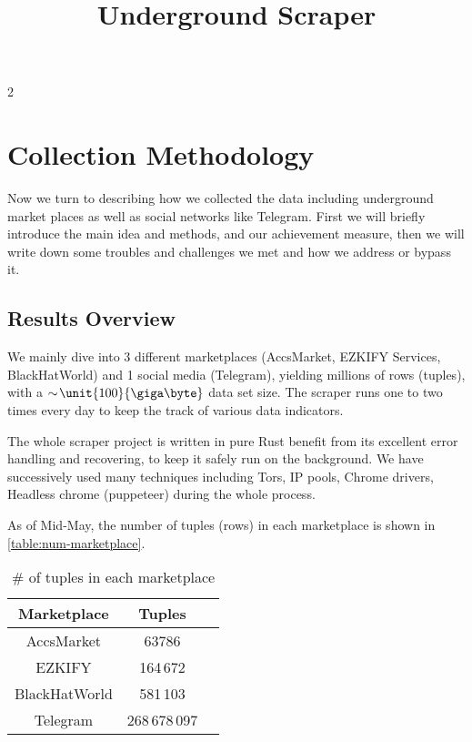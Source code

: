\documentclass{article}
\title{Underground Scraper}
\begin{document}
	\maketitle
	\addtocounter{section}2
	\section{Collection Methodology}

	Now we turn to describing how we collected the data including underground market places as well as social networks like Telegram.
	First we will briefly introduce the main idea and methods, and our achievement measure, then we will write down some troubles and challenges we met and how we address or bypass it.

	\subsection{Results Overview}

	We mainly dive into 3 different marketplaces (AccsMarket, EZKIFY Services, BlackHatWorld) and 1 social media (Telegram), yielding millions of rows (tuples), with a $\sim\!\unit {100} {\giga\byte}$ data set size. The scraper runs one to two times every day to keep the track of various data indicators.

	The whole scraper project is written in pure Rust benefit from its excellent error handling and recovering, to keep it safely run on the background. We have successively used many techniques including Tors\cite{tor}, IP pools, Chrome drivers, Headless chrome (puppeteer) during the whole process.

	As of Mid-May, the number of tuples (rows) in each marketplace is shown in \autoref{table:num-marketplace}.

	\begin{table}[htb]
		\centering
		\begin{tabular}{|c|c|c|}
			\hline
				Marketplace & Tuples \\
			\hline\hline
				AccsMarket & 63786 \\
			\hline
				EZKIFY & 164\,672 \\
			\hline
				BlackHatWorld & 581\,103 \\
			\hline
				Telegram & 268\,678\,097 \\
			\hline
		\end{tabular}
		\caption{\# of tuples in each marketplace}
		\label{table:num-marketplace}
	\end{table}
\end{document}
